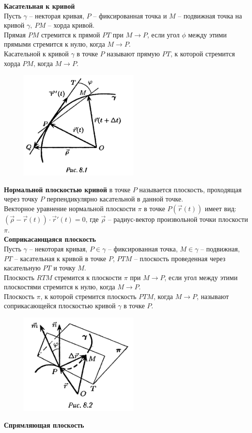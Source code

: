 \documentclass{report}
\begin{document}
\noindent
\textbf{Касательная к кривой}\\
Пусть $\gamma$ -- некторая кривая, $P$ -- фиксированная точка и $M$ -- подвижная точка на кривой
$\gamma,\ PM$ -- хорда кривой.\\
Прямая $PM$ стремится к прямой $PT$ при $M \to P$, если угол $\phi$ между этими прямыми стремится
к нулю, когда $M \to P$.\\
Касательной к кривой $\gamma$ в точке $P$ называют прямую $PT$, к которой стремится хорда $PM$,
когда $M \to P$.\\
\begin{figure}[ht!]
\centering
\includegraphics[width=60mm]{curve.png}
\end{figure}

\noindent
\textbf{Нормальной плоскостью кривой} в точке $P$ называется плоскость, проходящая через точку
$P$ перпендикулярно касательной в данной точке.\\
Векторное уравнение нормальной плоскости $\pi$ в точке $P(\overrightarrow{r}(t))$ имеет вид:
$(\overrightarrow{\rho} - \overrightarrow{r}(t)) \cdot \overrightarrow{r}'(t) = 0$, где 
$\overrightarrow{\rho}$ -- радиус-вектор произвольной точки плоскости $\pi$.\\

\newpage
\noindent
\textbf{Соприкасающаяся плоскость}\\
Пусть $\gamma$ -- некоторая кривая, $P \in \gamma$ -- фиксированная точка, $M \in \gamma$ --
подвижная, $PT$ -- касательная к кривой в точке $P$, $PTM$ -- плоскость проведенная через
касательную $PT$ и точку $M$.\\
Плоскость $RTM$ стремится к плоскости $\pi$ при $M \to P$, если угол между этими плоскостями
стремится к нулю, когда $M \to P$.\\
Плоскость $\pi$, к которой стремится плоскость $PTM$, когда $M \to P$, называют
соприкасающейся плоскостью кривой $\gamma$ в точке $P$.\\
\begin{figure}[ht!]
\centering
\includegraphics[width=60mm]{curve2.png}
\end{figure}


\noindent
\textbf{Спрямляющая плоскость}\\
\end{document}
